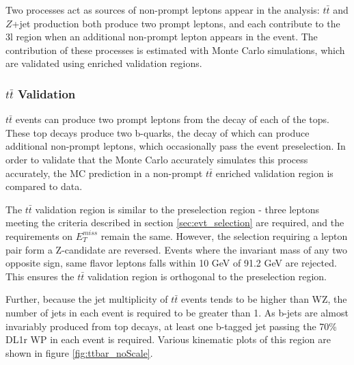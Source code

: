 Two processes act as sources of non-prompt leptons appear in the analysis: $t\bar{t}$ and $Z$+jet production both produce two prompt leptons, and each contribute to the 3l region when an additional non-prompt lepton appears in the event. The contribution of these processes is estimated with Monte Carlo simulations, which are validated using enriched validation regions.

\subsubsection{$t\bar{t}$ Validation}

$t\bar{t}$ events can produce two prompt leptons from the decay of each of the tops. These top decays produce two b-quarks, the decay of which can produce additional non-prompt leptons, which occasionally pass the event preselection. In order to validate that the Monte Carlo accurately simulates this process accurately, the MC prediction in a non-prompt $t\bar{t}$ enriched validation region is compared to data.

The $t\bar{t}$ validation region is similar to the preselection region - three leptons meeting the criteria described in section \ref{sec:evt_selection} are required, and the requirements on $E_T^{miss}$ remain the same. However, the selection requiring a lepton pair form a Z-candidate are reversed. Events where the invariant mass of any two opposite sign, same flavor leptons falls within 10 GeV of 91.2 GeV are rejected. This ensures the $t\bar{t}$ validation region is orthogonal to the preselection region. 

Further, because the jet multiplicity of $t\bar{t}$ events tends to be higher than WZ, the number of jets in each event is required to be greater than 1. As b-jets are almost invariably produced from top decays, at least one b-tagged jet passing the 70\% DL1r WP in each event is required. Various kinematic plots of this region are shown in figure \ref{fig:ttbar_noScale}.

